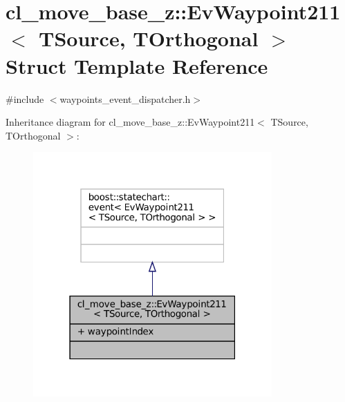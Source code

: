 \hypertarget{structcl__move__base__z_1_1EvWaypoint211}{}\section{cl\+\_\+move\+\_\+base\+\_\+z\+:\+:Ev\+Waypoint211$<$ T\+Source, T\+Orthogonal $>$ Struct Template Reference}
\label{structcl__move__base__z_1_1EvWaypoint211}


{\ttfamily \#include $<$waypoints\+\_\+event\+\_\+dispatcher.\+h$>$}



Inheritance diagram for cl\+\_\+move\+\_\+base\+\_\+z\+:\+:Ev\+Waypoint211$<$ T\+Source, T\+Orthogonal $>$\+:
\nopagebreak
\begin{figure}[H]
\begin{center}
\leavevmode
\includegraphics[width=259pt]{structcl__move__base__z_1_1EvWaypoint211__inherit__graph}
\end{center}
\end{figure}


